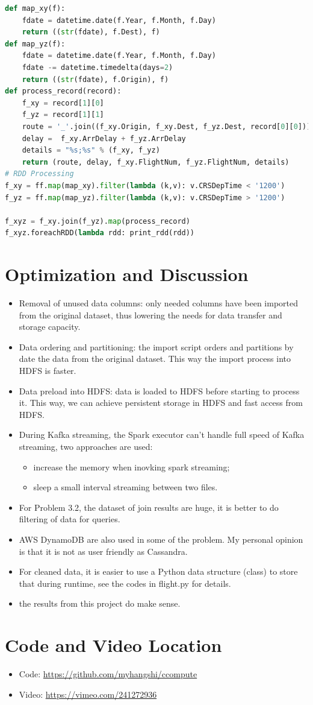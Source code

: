 \documentclass[fontsize=11pt,paper=a4]{scrartcl}
\begin{document}
\begin{lstlisting}[basicstyle=\small,language = python] 
def map_xy(f): 
    fdate = datetime.date(f.Year, f.Month, f.Day)
    return ((str(fdate), f.Dest), f)
def map_yz(f):
    fdate = datetime.date(f.Year, f.Month, f.Day)
    fdate -= datetime.timedelta(days=2)
    return ((str(fdate), f.Origin), f)
def process_record(record): 
    f_xy = record[1][0]
    f_yz = record[1][1]
    route = '_'.join((f_xy.Origin, f_xy.Dest, f_yz.Dest, record[0][0]))
    delay =  f_xy.ArrDelay + f_yz.ArrDelay
    details = "%s;%s" % (f_xy, f_yz)
    return (route, delay, f_xy.FlightNum, f_yz.FlightNum, details)    
# RDD Processing
f_xy = ff.map(map_xy).filter(lambda (k,v): v.CRSDepTime < '1200')
f_yz = ff.map(map_yz).filter(lambda (k,v): v.CRSDepTime > '1200')

f_xyz = f_xy.join(f_yz).map(process_record) 
f_xyz.foreachRDD(lambda rdd: print_rdd(rdd))
\end{lstlisting}


\section{Optimization and Discussion}
\begin{itemize}
\item Removal of unused data columns: only needed columns have been imported from the original dataset, thus lowering the needs for data transfer and storage capacity.
\item Data ordering and partitioning: the import script orders and partitions by date the data from the original dataset. This way the import process into HDFS is faster.
\item Data preload into HDFS: data  is loaded to HDFS before starting to process it. This way, we can achieve persistent storage in HDFS and fast access from HDFS.
\item During Kafka streaming, the Spark executor can't handle full speed of Kafka streaming, two approaches are used: 
\begin{itemize}
\item increase the memory when inovking spark streaming; 
\item sleep a small interval streaming between two files. 
\end{itemize} 
\item For Problem 3.2, the dataset of join results are huge, it is better to do filtering of data for queries. 
\item AWS DynamoDB are also used in some of the problem. My personal opinion is that it is not as user friendly as Cassandra. 
\item For cleaned data, it is easier to use a Python data structure (class) to store that during runtime, see the codes in flight.py for details. 
\item the results from this project do make sense. 
\end{itemize} 
 
\section{Code and Video Location}
\begin{itemize}
\item Code:    \url{https://github.com/myhangshi/ccompute}
\item Video:   \url{https://vimeo.com/241272936}
\end{itemize} 
\end{document}
